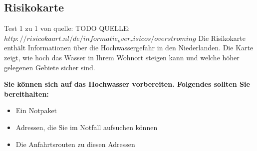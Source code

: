 \subsection{Risikokarte}
Test 1 zu 1 von quelle:
TODO
QUELLE: $http://risicokaart.nl/de/informatie_over_risicos/overstroming$
\newline\newline
\textnormal{Die Risikokarte enthält Informationen über die Hochwassergefahr in den Niederlanden. 
Die Karte zeigt, wie hoch das Wasser in Ihrem Wohnort steigen kann und welche höher gelegenen Gebiete sicher sind.
}

\textnormal{\newline\bfseries Sie können sich auf das Hochwasser vorbereiten. 
Folgendes sollten Sie bereithalten:}
 
\begin{itemize}  
\item Ein Notpaket
\item Adressen, die Sie im Notfall aufsuchen können
\item Die Anfahrtsrouten zu diesen Adressen
\end{itemize}  

